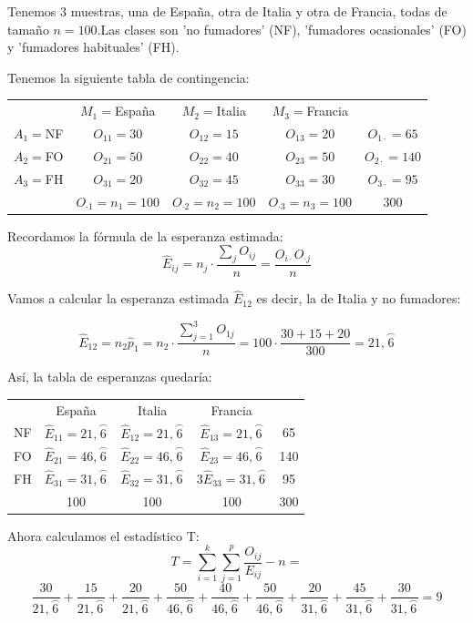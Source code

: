 \documentclass[palatino,nochap]{apuntes}
\begin{document}
\begin{example}
Tenemos 3 muestras, una de España, otra de Italia y otra de Francia, todas de tamaño $n=100$.Las clases son 'no fumadores' (NF), 'fumadores ocasionales' (FO) y 'fumadores habituales' (FH).

Tenemos la siguiente tabla de contingencia:

\begin{tabular}{ccccc}
& $M_1=$España & $M_2=$Italia & $M_3=$Francia & \\
$A_1=$NF & $O_{11}=30$ & $O_{12}=15$ & $O_{13}=20$ & $O_{1\cdot}=65$ \\
$A_2=$FO & $O_{21}=50$ & $O_{22}=40$ & $O_{23}=50$ & $O_{2\cdot}=140$ \\
$A_3=$FH & $O_{31}=20$ & $O_{32}=45$ & $O_{33}=30$ & $O_{3\cdot}=95$ \\
& $O_{\cdot1}=n_1=100$ & $O_{\cdot2}=n_2=100$ & $O_{\cdot3}=n_3=100$ & 300 \\
\end{tabular}

Recordamos la fórmula de la esperanza estimada:
$$\hat{E}_{ij} = n_j \cdot \frac{\sum_j O_{ij}}{n} = \frac{O_{i\cdot} O_{\cdot j}}{n}$$

Vamos a calcular la esperanza estimada $\hat{E}_{12}$ es decir, la de Italia y no fumadores:

$$\hat{E}_{12} = n_2 \hat{p}_1 = n_2 \cdot \frac{\sum_{j=1}^3 O_{1j}}{n} = 100 \cdot \frac{30+15+20}{300} = 21,\stackrel{\frown}{6}$$

Así, la tabla de esperanzas quedaría:

\begin{tabular}{ccccc}
& España & Italia & Francia & \\
NF & $\hat{E}_{11}=21,\stackrel{\frown}{6}$ & $\hat{E}_{12}=21,\stackrel{\frown}{6}$ & $\hat{E}_{13}=21,\stackrel{\frown}{6}$ & 65 \\
FO & $\hat{E}_{21}=46,\stackrel{\frown}{6}$ & $\hat{E}_{22}=46,\stackrel{\frown}{6}$ & $\hat{E}_{23}=46,\stackrel{\frown}{6}$ & 140 \\
FH & $\hat{E}_{31}=31,\stackrel{\frown}{6}$ & $\hat{E}_{32}=31,\stackrel{\frown}{6}$ & $3\hat{E}_{33}=31,\stackrel{\frown}{6}$ & 95 \\
& 100 & 100 & 100 & 300 \\
\end{tabular}

Ahora calculamos el estadístico T:
$$ T = \sum_{i=1}^k \sum_{j=1}^p \frac{O_{ij}}{E_{ij}}-n = $$
$$\frac{30}{21,\stackrel{\frown}{6}} + \frac{15}{21,\stackrel{\frown}{6}} + \frac{20}{21,\stackrel{\frown}{6}} + \frac{50}{46,\stackrel{\frown}{6}} + \frac{40}{46,\stackrel{\frown}{6}} +
\frac{50}{46,\stackrel{\frown}{6}} +
\frac{20}{31,\stackrel{\frown}{6}} +
\frac{45}{31,\stackrel{\frown}{6}} +
\frac{30}{31,\stackrel{\frown}{6}} = 9$$


\end{example}
\end{document}
